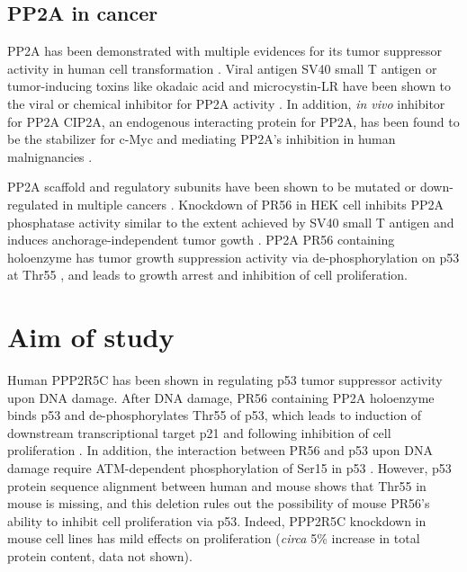\subsection{PP2A in cancer}

PP2A has been demonstrated with multiple evidences for its tumor suppressor activity in human cell transformation \cite{janssens_pp2a:_2005,mumby_pp2a:_2007}. Viral antigen SV40 small T antigen or tumor-inducing toxins like okadaic acid and microcystin-LR have been shown to the viral or chemical inhibitor for PP2A activity \cite{campbell_identification_1995,nagao_protein_1995}. In addition, \textit{in vivo} inhibitor for PP2A CIP2A, an endogenous interacting protein for PP2A, has been found to be the stabilizer for c-Myc and mediating PP2A's inhibition in human malnignancies \cite{khanna_cancerous_2013,junttila_cip2a_2007}. 

PP2A scaffold and regulatory subunits have been shown to be mutated or down-regulated in multiple cancers \cite{seshacharyulu_phosphatase:_2013}. Knockdown of PR56\textgamma{} in HEK cell inhibits PP2A phosphatase activity similar to the extent achieved by SV40 small T antigen and induces anchorage-independent tumor gowth \cite{chen_identification_2004}. PP2A PR56\textgamma{} containing holoenzyme has tumor growth suppression activity via de-phosphorylation on p53 at Thr55 \cite{li_specific_2007,shouse_serine_2008}, and leads to growth arrest and inhibition of cell proliferation.

\section{Aim of study}

Human PPP2R5C has been shown in regulating p53 tumor suppressor activity upon DNA damage\cite{li_specific_2007,shouse_serine_2008}. After DNA damage, PR56\textgamma{} containing PP2A holoenzyme binds p53 and de-phosphorylates Thr55 of p53, which leads to induction of downstream transcriptional target p21 and following inhibition of cell proliferation \cite{li_specific_2007}. In addition, the interaction between PR56\textgamma{} and p53 upon DNA damage require ATM-dependent phosphorylation of Ser15 in p53 \cite{shouse_serine_2008}. However, p53 protein sequence alignment between human and mouse shows that Thr55 in mouse is missing, and this deletion rules out the possibility of mouse PR56\textgamma{}'s ability to inhibit cell proliferation via p53. Indeed, PPP2R5C knockdown in mouse cell lines has mild effects on proliferation (\textit{circa} 5\% increase in total protein content, data not shown).

